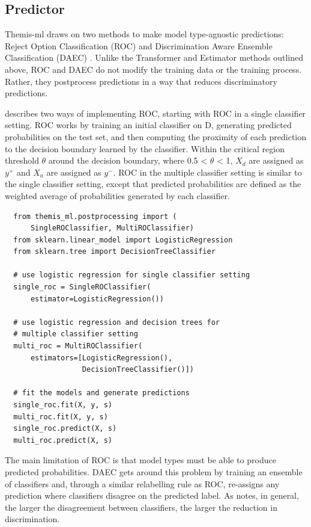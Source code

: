 \documentclass{acm_proc_article-sp}
\begin{document}
\subsection{Predictor}

Themis-ml draws on two methods to make model type-agnostic predictions: Reject
Option Classification (ROC) and Discrimination Aware Ensemble Classification
(DAEC) \cite{kamiran2012decision}. Unlike the Transformer and Estimator methods
outlined above, ROC and DAEC do not modify the training data or the training
process. Rather, they postprocess predictions in a way that reduces
discriminatory predictions.

\cite{kamiran2012decision} describes two ways of implementing ROC, starting with
ROC in a single classifier setting. ROC works by training an initial classifier
on D, generating predicted probabilities on the test set, and then computing the
proximity of each prediction to the decision boundary learned by the classifier.
Within the critical region threshold \(\theta\) around the decision boundary,
where 0.5 < \(\theta\) < 1, \(X_d\) are assigned as \(y^{+}\) and \(X_a\) are
assigned as \(y^{-}\). ROC in the multiple classifier setting is similar to the
single classifier setting, except that predicted probabilities are defined as
the weighted average of probabilities generated by each classifier.

\begin{verbatim}
  from themis_ml.postprocessing import (
      SingleROClassifier, MultiROClassifier)
  from sklearn.linear_model import LogisticRegression
  from sklearn.tree import DecisionTreeClassifier

  # use logistic regression for single classifier setting
  single_roc = SingleROClassifier(
      estimator=LogisticRegression())

  # use logistic regression and decision trees for
  # multiple classifier setting
  multi_roc = MultiROClassifier(
      estimators=[LogisticRegression(),
                  DecisionTreeClassifier()])

  # fit the models and generate predictions
  single_roc.fit(X, y, s)
  multi_roc.fit(X, y, s)
  single_roc.predict(X, s)
  multi_roc.predict(X, s)
\end{verbatim}

The main limitation of ROC is that model types must be able to produce predicted
probabilities. DAEC gets around this problem by training an ensemble of
classifiers and, through a similar relabelling rule as ROC, re-assigns any
prediction where classifiers disagree on the predicted label. As
\cite{kamiran2012decision} notes, in general, the larger the disagreement
between classifiers, the larger the reduction in discrimination.
\end{document}
